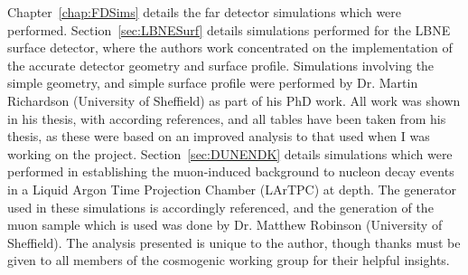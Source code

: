 \begin{declaration}
  Chapter~\ref{chap:FDSims} details the far detector simulations which were performed. Section~\ref{sec:LBNESurf} details simulations performed for the LBNE surface detector, where the authors work concentrated on the implementation of the accurate detector geometry and surface profile. Simulations involving the simple geometry, and simple surface profile were performed by Dr. Martin Richardson (University of Sheffield) as part of his PhD work. All work was shown in his thesis, with according references, and all tables have been taken from his thesis, as these were based on an improved analysis to that used when I was working on the project. Section~\ref{sec:DUNENDK} details simulations which were performed in establishing the muon-induced background to nucleon decay events in a Liquid Argon Time Projection Chamber (LArTPC) at depth. The generator used in these simulations is accordingly referenced, and the generation of the muon sample which is used was done by Dr. Matthew Robinson (University of Sheffield). The analysis presented is unique to the author, though thanks must be given to all members of the cosmogenic working group for their helpful insights. \\
  

\end{declaration}

